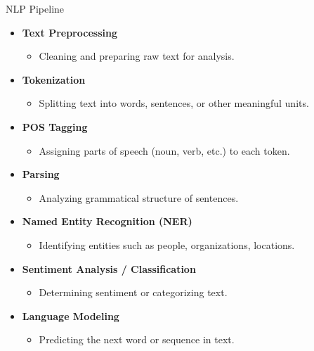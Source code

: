 \begin{frame}[allowframebreaks]{NLP Pipeline}
    \begin{itemize}
        \item \textbf{Text Preprocessing}
        \vspace{-0.5em}
        \begin{itemize}
            \item Cleaning and preparing raw text for analysis.
        \end{itemize}
        \item \textbf{Tokenization}
        \vspace{-0.5em}
        \begin{itemize}
            \item Splitting text into words, sentences, or other meaningful units.
        \end{itemize}
        \item \textbf{POS Tagging}
        \vspace{-0.5em}
        \begin{itemize}
            
            \item Assigning parts of speech (noun, verb, etc.) to each token.
        \end{itemize}
        \item \textbf{Parsing}
        \vspace{-0.5em}
        \begin{itemize}
            
            \item Analyzing grammatical structure of sentences.
        \end{itemize}
        \item \textbf{Named Entity Recognition (NER)}
        \vspace{-0.5em}
        \begin{itemize}
            
            \item Identifying entities such as people, organizations, locations.
        \end{itemize}
        \item \textbf{Sentiment Analysis / Classification}
        \vspace{-0.5em}
        \begin{itemize}
            
            \item Determining sentiment or categorizing text.
        \end{itemize}
        \item \textbf{Language Modeling}
        \vspace{-0.5em}
        \begin{itemize}
            
            \item Predicting the next word or sequence in text.
        \end{itemize}
    \end{itemize}
\end{frame}

